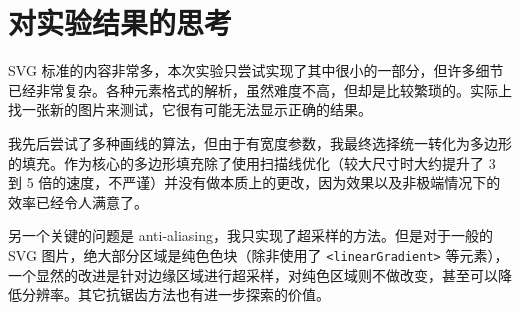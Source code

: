 \documentclass[UTF8]{ctexart}
\begin{document}
\section{对实验结果的思考}

SVG 标准的内容非常多，本次实验只尝试实现了其中很小的一部分，但许多细节已经非常复杂。各种元素格式的解析，虽然难度不高，但却是比较繁琐的。实际上找一张新的图片来测试，它很有可能无法显示正确的结果。

我先后尝试了多种画线的算法，但由于有宽度参数，我最终选择统一转化为多边形的填充。作为核心的多边形填充除了使用扫描线优化（较大尺寸时大约提升了 3 到 5 倍的速度，不严谨）并没有做本质上的更改，因为效果以及非极端情况下的效率已经令人满意了。

另一个关键的问题是 anti-aliasing，我只实现了超采样的方法。但是对于一般的 SVG 图片，绝大部分区域是纯色色块（除非使用了 \texttt{<linearGradient>} 等元素），一个显然的改进是针对边缘区域进行超采样，对纯色区域则不做改变，甚至可以降低分辨率。其它抗锯齿方法也有进一步探索的价值。
\end{document}
